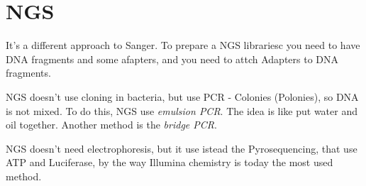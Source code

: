 \section{NGS}

It's a different approach to Sanger.
To prepare a NGS librariesc you need to have DNA fragments and some afapters,
and you need to attch Adapters to DNA fragments.

NGS doesn't use cloning in bacteria, but use PCR - Colonies (Polonies), so DNA
is not mixed. To do this, NGS use \textit{emulsion PCR}. The idea is like put
water and oil together.
Another method is the \textit{bridge PCR}.

NGS doesn't need electrophoresis, but it use istead the Pyrosequencing, that
use ATP and Luciferase, by the way Illumina chemistry is today the most used
method.
